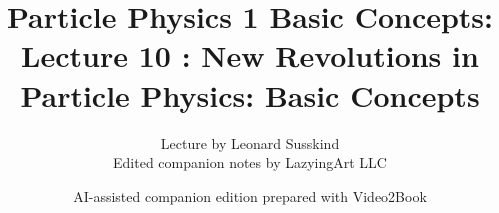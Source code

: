\documentclass[11pt,oneside]{book}
\begin{document}
\frontmatter
\title{Particle Physics 1 Basic Concepts: Lecture 10 : New Revolutions in Particle Physics: Basic Concepts}
\author{Lecture by Leonard Susskind\\Edited companion notes by LazyingArt LLC}
\date{AI-assisted companion edition prepared with Video2Book}
\maketitle
\clearpage
\mainmatter

\end{document}
